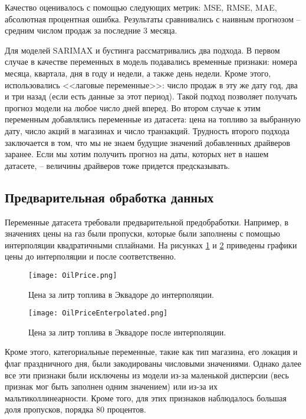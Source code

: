 \documentclass[]{article}
\begin{document}
Качество оценивалось с помощью следующих метрик: MSE, RMSE, MAE, абсолютная процентная ошибка. Результаты сравнивались с наивным прогнозом -- средним числом продаж за последние 3 месяца. 

Для моделей SARIMAX и бустинга рассматривались два подхода. В первом случае в качестве переменных в модель подавались временные признаки: номера месяца, квартала, дня в году и недели, а также день недели.
Кроме этого, использовались <<лаговые переменные>>: число продаж в эту же дату год, два и три назад (если есть данные за этот период). Такой подход позволяет получать прогноз модели на любое число дней вперед. Во втором случае к этим переменным добавлялись переменные из датасета: цена на топливо за выбранную дату, число акций в магазинах и число транзакций. Трудность второго подхода заключается в том, что мы не знаем будущие значений добавленных драйверов заранее. Если мы хотим получить прогноз на даты, которых нет в нашем датасете, -- величины драйверов тоже придется предсказывать.

\subsection{Предварительная обработка данных}

Переменные датасета требовали предварительной предобработки. Например, в значениях цены на газ были пропуски, которые были заполнены с помощью интерполяции квадратичными сплайнами. На рисунках \ref{price_raw} и \ref{price_solid} приведены графики цены до интерполяции и после соответственно.

\begin{figure}[h!]
	\centering
	\texttt{[image: OilPrice.png]}
	\caption{Цена за литр топлива в Эквадоре до интерполяции.}
	\label{price_raw}
\end{figure}


\begin{figure}[h!]
	\centering
	\texttt{[image: OilPriceEnterpolated.png]}
	\caption{Цена за литр топлива в Эквадоре после интерполяции.}
	\label{price_solid}
\end{figure}

Кроме этого, категориальные переменные, такие как тип магазина, его локация и флаг праздничного дня, были закодированы числовыми значениями. Однако далее все эти признаки были исключены из модели из-за маленькой дисперсии (весь признак мог быть заполнен одним значением) или из-за их мальтиколлинеарности. Кроме того, для этих признаков наблюдалось большая доля пропусков, порядка 80 процентов.
\end{document}
